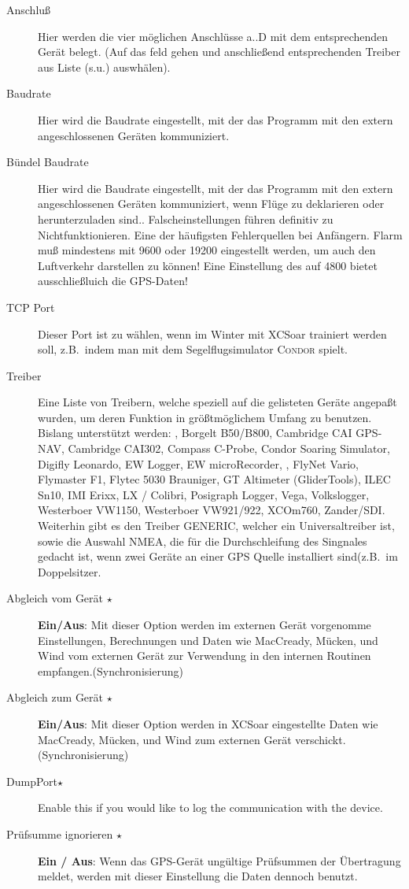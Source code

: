 \begin{description}
\item[Anschluß]  Hier werden die vier möglichen Anschlüsse a..D mit dem entsprechenden Gerät belegt. (Auf das feld gehen und anschließend entsprechenden Treiber aus Liste (s.u.) auswhälen).
\item[Baudrate] Hier wird die Baudrate eingestellt, mit der das Programm mit den extern angeschlossenen Geräten kommuniziert.
\item[Bündel Baudrate]  Hier wird die Baudrate eingestellt, mit der das Programm mit den extern angeschlossenen Geräten kommuniziert, wenn Flüge zu deklarieren oder herunterzuladen sind..
Falscheinstellungen führen definitiv zu Nichtfunktionieren. Eine der häufigsten  Fehlerquellen bei Anfängern.
\achtung Flarm muß  mindestens mit 9600 oder 19200 eingestellt werden, um auch den Luftverkehr darstellen zu können! Eine Einstellung des \fl auf 4800 bietet ausschließluich die GPS-Daten!
\item[TCP Port]  Dieser Port ist zu wählen, wenn  im Winter mit \textsf{XCSoar} trainiert werden soll, z.B.\ indem man  mit dem
Segelflugsimulator \textsc{Condor} spielt.
\item[Treiber] Eine Liste von Treibern, welche speziell auf die gelisteten Geräte angepaßt wurden, um deren Funktion in größtmöglichem Umfang zu benutzen.
Bislang unterstützt werden: \al, Borgelt B50/B800, Cambridge CAI GPS-NAV, Cambridge CAI302, Compass C-Probe, Condor Soaring Simulator, Digifly Leonardo,  EW Logger, EW microRecorder,
\fl, FlyNet Vario, Flymaster F1, Flytec 5030 Brauniger, GT Altimeter (GliderTools), ILEC Sn10, IMI Erixx, LX / Colibri, Posigraph Logger, Vega, Volkslogger, Westerboer VW1150, Westerboer VW921/922, XCOm760, Zander/SDI.
Weiterhin gibt es den Treiber GENERIC, welcher ein Universaltreiber ist, sowie die Auswahl NMEA, die für die Durchschleifung des Singnales gedacht ist, wenn zwei Geräte an einer GPS Quelle installiert sind(z.B.\ im Doppelsitzer.
\item[Abgleich vom Gerät $\star$]  {\bf Ein/Aus}: Mit dieser Option werden im externen Gerät vorgenomme Einstellungen, Berechnungen und Daten wie MacCready, Mücken, und Wind vom externen Gerät zur Verwendung in den internen Routinen empfangen.(Synchronisierung)
\item[Abgleich zum Gerät $\star$]  {\bf Ein/Aus}: Mit dieser Option werden in \textsf{XCSoar} eingestellte Daten wie MacCready, Mücken, und Wind zum externen Gerät verschickt. (Synchronisierung)
\item[DumpPort$\star$]  Enable this if you would like to log the communication with the device.
\item[Prüfsumme ignorieren $\star$] {\bf Ein / Aus}: Wenn das GPS-Gerät ungültige Prüfsummen der Übertragung meldet, werden mit
dieser Einstellung  die Daten dennoch benutzt.
\end{description}


